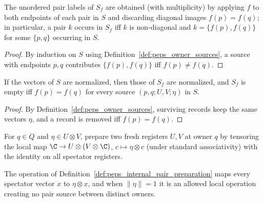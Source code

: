 \begin{lemma}
    \label{thm:peps_owner_source_pairs}
    \leanok
    The unordered pair labels of $S_f$ are obtained (with multiplicity) by
    applying $f$ to both endpoints of each pair in $S$ and discarding diagonal
    images $f(p)=f(q)$; in particular, a pair $k$ occurs in $S_f$ iff $k$ is
    non-diagonal and $k=\{f(p),f(q)\}$ for some $\{p,q\}$ occurring in $S$.
\end{lemma}

\begin{proof}\leanok
    By induction on $S$ using Definition~\ref{def:peps_owner_sources}, a
    source with endpoints $p,q$ contributes $\{f(p),f(q)\}$ iff $f(p)\ne f(q)$.
\end{proof}

\begin{lemma}
    \label{thm:peps_owner_sources_internal}
    \leanok
    If the vectors of $S$ are normalized, then those of $S_f$ are normalized,
    and $S_f$ is empty iff $f(p)=f(q)$ for every source $(p,q;U,V;\eta)$ in $S$.
\end{lemma}

\begin{proof}\leanok
    By Definition~\ref{def:peps_owner_sources}, surviving records keep the
    same vectors $\eta$, and a record is removed iff $f(p)=f(q)$.
\end{proof}

\begin{definition}
    \label{def:peps_internal_pair_preparation}
    \leanok
    For $q\in Q$ and $\eta\in U\otimes V$, prepare two fresh registers $U,V$
    at owner $q$ by tensoring the local map $\C\to U\otimes(V\otimes\C)$,
    $c\mapsto\eta\otimes c$ (under standard associativity) with the identity
    on all spectator registers.
\end{definition}

\begin{lemma}
    \label{thm:peps_internal_pair_preparation}
    \leanok
    The operation of Definition~\ref{def:peps_internal_pair_preparation} maps
    every spectator vector $x$ to $\eta\otimes x$, and when $\|\eta\|=1$ it is
    an allowed local operation creating no pair source between distinct owners.
\end{lemma}

